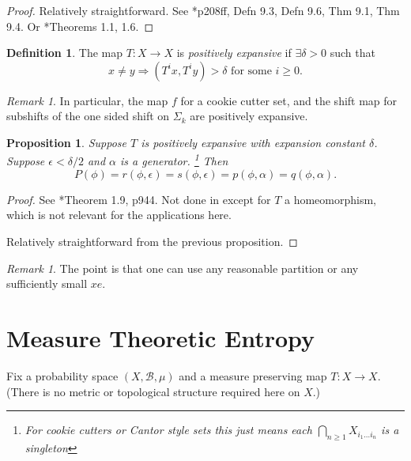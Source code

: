 \documentclass[a4paper]{amsart}
\theoremstyle{plain}
\newtheorem{proposition}[theorem]{Proposition}
\theoremstyle{definition}
\newtheorem{definition}[theorem]{Definition}%
\theoremstyle{remark}
\newtheorem{remark}[theorem]{Remark}
\begin{document}
\begin{proof} Relatively straightforward.  See \cite{Wal}*{p208ff, Defn 9.3, Defn 9.6, Thm 9.1, Thm 9.4}. Or \cite{Walvp}*{Theorems 1.1, 1.6}.
\end{proof} 

\begin{definition} The map $ T:X\to X $ is \emph{positively expansive} if $ \exists \delta > 0 $ such that 
\[
x\neq y \Longrightarrow (T^ix,T^iy) > \delta \text{ for some } i \geq 0.
\]
\end{definition}

\begin{remark}
In particular, the map $ f $ for a cookie cutter set, and the shift map for subshifts of the one sided shift on $ \Sigma_k $ are positively expansive.
   \end{remark}

\begin{proposition} \label{pressalt2}
   Suppose $ T $ is positively expansive with expansion constant $ \delta $.  Suppose $ \epsilon < \delta/2 $ and $ \alpha $ is a generator.%
   \footnote{For cookie cutters or Cantor style sets this just means each $ \bigcap_{n\geq 1}  X_{i_1\dots i_n} $ is a singleton}
 Then
   \[
   P(\phi) = r(\phi, \epsilon ) = s(\phi, \epsilon) = p(\phi, \alpha ) = q(\phi, \alpha) .
   \]
\end{proposition}

\begin{proof} See \cite{Walvp}*{Theorem 1.9, p944}.  Not done in \cite{Wal} except for $ T $ a homeomorphism, which is not  relevant for the applications here.

Relatively straightforward from the previous proposition.  
\end{proof}

\begin{remark}  The point is that one can use any reasonable partition or any sufficiently small $ x e $.
 \end{remark}

 

\section{\textbf{Measure Theoretic Entropy}} \label{secmte}
 
 Fix a probability space $ (X, \mathcal{B} , \mu) $ and a measure preserving map $ T:X \to X $. (There is no metric or topological structure required here on $ X $.)
 
\end{document}
